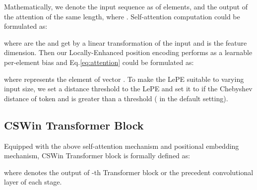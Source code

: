 \documentclass[10pt,twocolumn,letterpaper]{article}
\begin{document}
Mathematically, we denote the input sequence as  of  elements, and the output of the attention  of the same length, where . Self-attention computation could be formulated as:



where  are the  and  get by a linear transformation of the input  and  is the feature dimension. Then our Locally-Enhanced position encoding performs as a learnable per-element bias and Eq.\ref{eq:attention} could be formulated as:

where  represents the  element of vector . To make the LePE suitable to varying input size, we set a distance threshold to the LePE and set it to  if the Chebyshev distance of token  and  is greater than a threshold   ( in the default setting).

\iffalse
Suppose the edge between the \emph{value} elements  and  is represented by vectors , then

However, if we consider all connections in , it will require a huge computation cost. We hypothesize that, for a specific input element, the most important positional information is from its local neighborhood. So we propose locally-enhanced positional encoding (LePE) and implement it with a depth-wise convolution operator~\cite{chollet2017xception} applying on \emph{value} V: 

In this way, LePE can be friendly applied to the downstream tasks that take arbitrary input resolutions as input. 
\fi


\subsection{CSWin Transformer Block} 
Equipped with the above self-attention mechanism and positional embedding mechanism, CSWin Transformer block is formally defined as:

where  denotes the output of -th Transformer block or the precedent convolutional layer of each stage.
\end{document}
